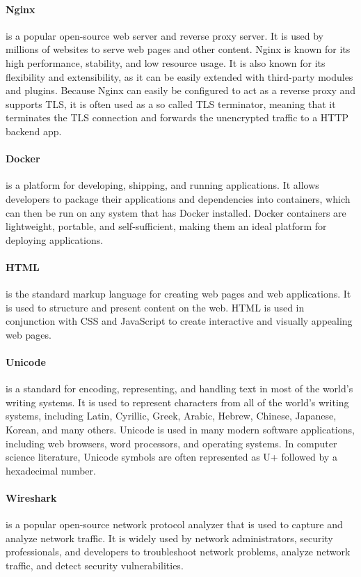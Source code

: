 \documentclass[12pt]{scrbook}
\begin{document}
\paragraph{Nginx} is a popular open-source web server and reverse proxy server. It is
used by millions of websites to serve web pages and other content. Nginx is
known for its high performance, stability, and low resource usage. It is also
known for its flexibility and extensibility, as it can be easily extended with
third-party modules and plugins. Because Nginx can easily be configured to act
as a reverse proxy and supports TLS, it is often used as a so called TLS
terminator, meaning that it terminates the TLS connection and forwards the
unencrypted traffic to a HTTP backend app.

\paragraph{Docker} is a platform for
developing, shipping, and running applications. It allows developers to package
their applications and dependencies into containers, which can then be run on
any system that has Docker installed. Docker containers are lightweight,
portable, and self-sufficient, making them an ideal platform for deploying applications.

\paragraph{HTML} is the standard markup language for creating web pages
and web applications. It is used to structure and present content on the web.
HTML is used in conjunction with CSS and JavaScript to create interactive and
visually appealing web pages.

\paragraph{Unicode} is a standard for encoding,
representing, and handling text in most of the world's writing systems. It is
used to represent characters from all of the world's writing systems, including
Latin, Cyrillic, Greek, Arabic, Hebrew, Chinese, Japanese, Korean, and many
others. Unicode is used in many modern software applications, including web
browsers, word processors, and operating systems. In computer science
literature, Unicode symbols are often represented as U+ followed by a
hexadecimal number.

\paragraph{Wireshark} is a popular open-source network protocol
analyzer that is used to capture and analyze network traffic. It is widely used
by network administrators, security professionals, and developers to
troubleshoot network problems, analyze network traffic, and detect security
vulnerabilities.
\end{document}
